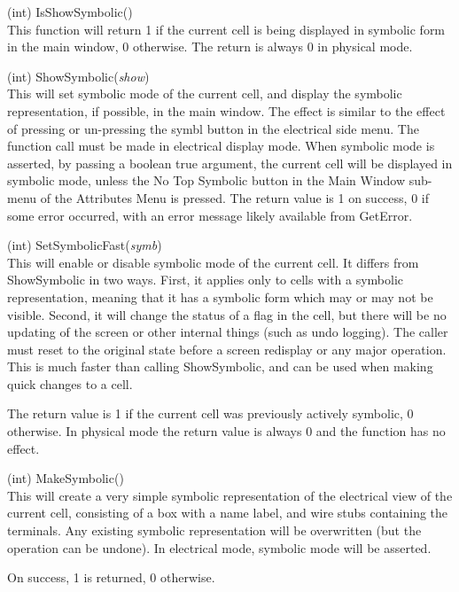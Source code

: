 \begin{description}
\item{(int) \vt IsShowSymbolic()}\\
This function will return 1 if the current cell is being displayed in
symbolic form in the main window, 0 otherwise.  The return is always 0
in physical mode.

\item{(int) \vt ShowSymbolic({\it show\/})}\\
This will set symbolic mode of the current cell, and display the
symbolic representation, if possible, in the main window.  The effect
is similar to the effect of pressing or un-pressing the {\cb symbl}
button in the electrical side menu.  The function call must be made in
electrical display mode.  When symbolic mode is asserted, by passing a
boolean true argument, the current cell will be displayed in symbolic
mode, unless the {\cb No Top Symbolic} button in the {\cb Main Window}
sub-menu of the {\cb Attributes Menu} is pressed.  The return value is
1 on success, 0 if some error occurred, with an error message likely
available from {\vt GetError}.

\item{(int) \vt SetSymbolicFast({\it symb\/})}\\
This will enable or disable symbolic mode of the current cell.  It
differs from {\vt ShowSymbolic} in two ways.  First, it applies only
to cells with a symbolic representation, meaning that it has a
symbolic form which may or may not be visible.  Second, it will change
the status of a flag in the cell, but there will be no updating of the
screen or other internal things (such as undo logging).  The caller
must reset to the original state before a screen redisplay or any
major operation.  This is much faster than calling {\vt ShowSymbolic},
and can be used when making quick changes to a cell.

The return value is 1 if the current cell was previously actively
symbolic, 0 otherwise.  In physical mode the return value is always 0
and the function has no effect.

\item{(int) \vt MakeSymbolic()}\\
This will create a very simple symbolic representation of the
electrical view of the current cell, consisting of a box with a name
label, and wire stubs containing the terminals.  Any existing symbolic
representation will be overwritten (but the operation can be undone). 
In electrical mode, symbolic mode will be asserted.

On success, 1 is returned, 0 otherwise.

\end{description}

